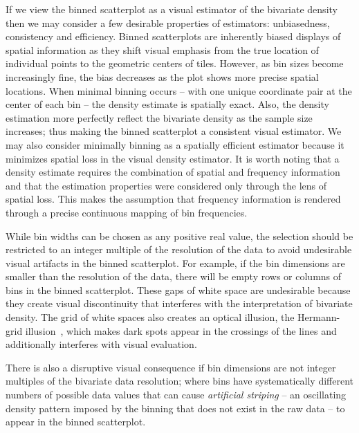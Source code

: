 \documentclass[11pt]{isuthesis}\usepackage[]{graphicx}\usepackage[]{color}
\begin{document}
If we view the binned scatterplot as a visual estimator of the bivariate density then we may consider a few desirable properties of estimators: unbiasedness, consistency and efficiency. Binned scatterplots are inherently biased displays of spatial information as they shift visual emphasis from the true location of individual points to the geometric centers of tiles. However, as bin sizes become increasingly fine,  the bias decreases as the plot shows more precise spatial locations. When minimal binning occurs -- with one unique coordinate pair at the center of each bin -- the density estimate is spatially exact. Also, the density estimation more perfectly reflect the bivariate density as the sample size increases; thus making the binned scatterplot a consistent visual estimator. We may also consider minimally binning as a spatially efficient estimator because it minimizes spatial loss in the visual density estimator. It is worth noting that a density estimate requires the combination of spatial and frequency information and that the estimation properties were considered only through the lens of spatial loss. This makes the assumption that frequency information is rendered through a precise continuous mapping of bin frequencies. %

While bin widths can be chosen as any positive real value, the selection should be restricted to an integer multiple of the resolution of the data to avoid undesirable visual artifacts in the binned scatterplot. For example, if the bin dimensions are smaller than the resolution of the data, there will be empty rows or columns of bins in the binned scatterplot.  These gaps of white space are undesirable because they create visual discontinuity that interferes with the interpretation of bivariate density. The grid of white spaces also creates an optical illusion, the Hermann-grid illusion~\citep{hermann:1870, spillmann:1994}, which makes dark spots appear in the crossings of the lines and additionally interferes with visual evaluation.

There is also a disruptive visual consequence if bin dimensions are not integer multiples of the bivariate data resolution; where bins have systematically different numbers of possible data values that can cause \textit{artificial striping} -- an oscillating density pattern imposed by the binning that does not exist in the raw data -- to appear in the binned scatterplot.  
\end{document}
